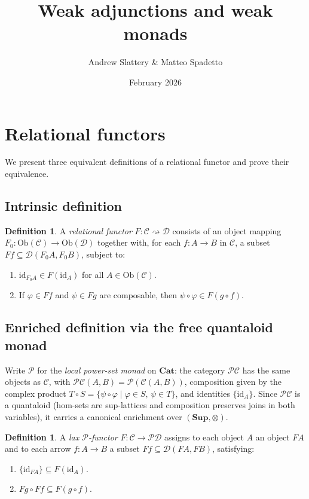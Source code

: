 \documentclass{article}
\title{Weak adjunctions and weak monads}
\author{Andrew Slattery \& Matteo Spadetto}
\date{February 2026}
\theoremstyle{plain}
\theoremstyle{definition}
\newtheorem{definition}[theorem]{Definition}
\newcommand{\Ob}{\mathrm{Ob}}
\newcommand{\id}{\mathrm{id}}
\newcommand{\Cat}{\mathbf{Cat}}
\newcommand{\cP}{\mathcal{P}}
\newcommand{\cC}{\mathcal{C}}
\newcommand{\cD}{\mathcal{D}}
\begin{document}
\maketitle

\section{Relational functors}\label{sec:functors}

We present three equivalent definitions of a relational functor and prove their equivalence.

\subsection{Intrinsic definition}

\begin{definition}\label{def:relfun}
A \emph{relational functor} $F\colon \cC \rightsquigarrow \cD$ consists of an object mapping $F_0\colon \Ob(\cC) \to \Ob(\cD)$ together with, for each $f\colon A \to B$ in $\cC$, a subset $Ff \subseteq \cD(F_0 A, F_0 B)$, subject to:
\begin{enumerate}[label=\textup{(RF-\arabic*)}]
    \item\label{ax:id} $\id_{F_0 A} \in F(\id_A)$ for all $A \in \Ob(\cC)$.
    \item\label{ax:comp} If $\varphi \in Ff$ and $\psi \in Fg$ are composable, then $\psi \circ \varphi \in F(g \circ f)$.
\end{enumerate}
\end{definition}

\subsection{Enriched definition via the free quantaloid monad}\label{ssec:enriched}

Write $\cP$ for the \emph{local power-set monad} on $\Cat$: the category $\cP\cC$ has the same objects as $\cC$, with $\cP\cC(A,B) = \mathcal{P}(\cC(A,B))$, composition given by the complex product $T \circ S = \{\psi \circ \varphi \mid \varphi \in S,\, \psi \in T\}$, and identities $\{\id_A\}$.  Since $\cP\cC$ is a quantaloid (hom-sets are sup-lattices and composition preserves joins in both variables), it carries a canonical enrichment over $(\mathbf{Sup}, \otimes)$.

\begin{definition}\label{def:laxP}
A \emph{lax $\cP$-functor} $F\colon \cC \to \cP\cD$ assigns to each object $A$ an object $FA$ and to each arrow $f\colon A \to B$ a subset $Ff \subseteq \cD(FA, FB)$, satisfying:
\begin{enumerate}[label=\textup{(Lax-\arabic*)}]
    \item $\{\id_{FA}\} \subseteq F(\id_A)$.
    \item $Fg \circ Ff \subseteq F(g \circ f)$.
\end{enumerate}
\end{definition}
\end{document}
